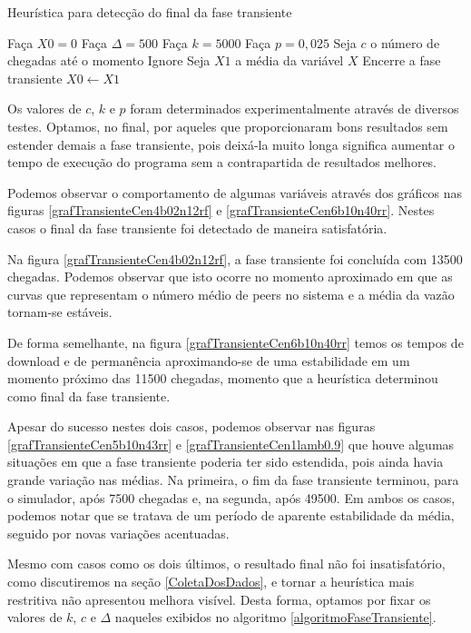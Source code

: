 \documentclass[a4paper,10pt]{article}
\begin{document}
\begin{algorithm}[H]
	\caption{Heurística para detecção do final da fase transiente}
	\label{algoritmoFaseTransiente}
	\begin{algorithmic}
		\STATE Faça $X0 = 0$
		\STATE Faça $\Delta = 500$
		\STATE Faça $k = 5000$
		\STATE Faça $p = 0,025$
		\STATE Seja $c$ o número de chegadas até o momento
				\STATE Ignore
				\STATE Seja $X1$ a média da variável $X$
					\STATE Encerre a fase transiente
				\ELSE
					\STATE $X0 \leftarrow X1$
				\ENDIF
			\ENDIF
		\ENDFOR
	\end{algorithmic}
\end{algorithm}

Os valores de $c$, $k$ e $p$ foram determinados experimentalmente através de diversos testes. Optamos, no final, por aqueles que proporcionaram bons resultados sem estender demais a fase transiente, pois deixá-la muito longa significa aumentar o tempo de execução do programa sem a contrapartida de resultados melhores.

Podemos observar o comportamento de algumas variáveis através dos gráficos nas figuras \ref{grafTransienteCen4b02n12rf} e \ref{grafTransienteCen6b10n40rr}. Nestes casos o final da fase transiente foi detectado de maneira satisfatória.

Na figura \ref{grafTransienteCen4b02n12rf}, a fase transiente foi concluída com 13500 chegadas. Podemos observar que isto ocorre no momento aproximado em que as curvas que representam o número médio de peers no sistema e a média da vazão tornam-se estáveis.

De forma semelhante, na figura \ref{grafTransienteCen6b10n40rr} temos os tempos de download e de permanência aproximando-se de uma estabilidade em um momento próximo das 11500 chegadas, momento que a heurística determinou como final da fase transiente.

Apesar do sucesso nestes dois casos, podemos observar nas figuras \ref{grafTransienteCen5b10n43rr} e \ref{grafTransienteCen1lamb0.9} que houve algumas situações em que a fase transiente poderia ter sido estendida, pois ainda havia grande variação nas médias. Na primeira, o fim da fase transiente terminou, para o simulador, após 7500 chegadas e, na segunda, após 49500. Em ambos os casos, podemos notar que se tratava de um período de aparente estabilidade da média, seguido por novas variações acentuadas.

Mesmo com casos como os dois últimos, o resultado final não foi insatisfatório, como discutiremos na seção \ref{ColetaDosDados}, e tornar a heurística mais restritiva não apresentou melhora visível. Desta forma, optamos por fixar os valores de $k$, $c$ e $\Delta$ naqueles exibidos no algoritmo \ref{algoritmoFaseTransiente}.
\end{document}
